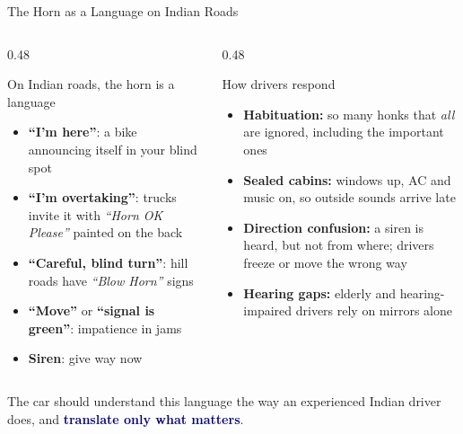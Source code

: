 \documentclass[aspectratio=169,10pt,t,xcolor=table]{beamer}
\newcommand{\hl}[1]{\textcolor{navy}{\textbf{#1}}}
\begin{document}
\begin{frame}{The Horn as a Language on Indian Roads}
\vspace{-0.3cm}
\begin{columns}[T]
\begin{column}{0.48\textwidth}
\begin{block}{On Indian roads, the horn is a language}
\begin{itemize}\small
  \item \textbf{``I'm here''}: a bike announcing itself in your blind spot
  \item \textbf{``I'm overtaking''}: trucks invite it with \emph{``Horn OK Please''} painted on the back
  \item \textbf{``Careful, blind turn''}: hill roads have \emph{``Blow Horn''} signs
  \item \textbf{``Move''} or \textbf{``signal is green''}: impatience in jams
  \item \textbf{Siren}: give way now
\end{itemize}
\end{block}
\end{column}
\begin{column}{0.48\textwidth}
\begin{block}{How drivers respond}
\begin{itemize}\small
  \item \textbf{Habituation:} so many honks that \emph{all} are ignored, including the important ones
  \item \textbf{Sealed cabins:} windows up, AC and music on, so outside sounds arrive late
  \item \textbf{Direction confusion:} a siren is heard, but not from where; drivers freeze or move the wrong way
  \item \textbf{Hearing gaps:} elderly and hearing-impaired drivers rely on mirrors alone
\end{itemize}
\end{block}
\end{column}
\end{columns}
\vspace{14pt}
\centering\small The car should understand this language the way an experienced Indian driver does, and \hl{translate only what matters}.
\end{frame}
\end{document}
